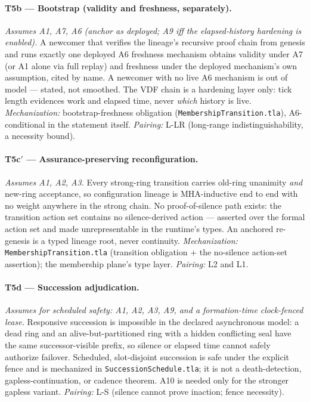 \documentclass[11pt]{article}
\newcommand{\code}[1]{\texttt{#1}}
\begin{document}
\paragraph{T5b --- Bootstrap (validity and freshness, separately).}
\textit{Assumes A1, A7, A6 (anchor as deployed; A9 iff the elapsed-history
hardening is enabled).} A newcomer that verifies the lineage's recursive
proof chain from genesis and runs exactly one deployed A6 freshness
mechanism obtains validity under A7 (or A1 alone via full replay) and
freshness under the deployed mechanism's own assumption, cited by name. A
newcomer with no live A6 mechanism is out of model --- stated, not
smoothed. The VDF chain is a hardening layer only: tick length evidences
work and elapsed time, never \emph{which} history is live.
\textit{Mechanization:} bootstrap-freshness obligation
(\code{MembershipTransition.tla}), A6-conditional in the statement
itself. \textit{Pairing:} L-LR (long-range indistinguishability, a
necessity bound).

\paragraph{T5c\('\) --- Assurance-preserving reconfiguration.}
\textit{Assumes A1, A2, A3.} Every strong-ring transition carries old-ring
unanimity \emph{and} new-ring acceptance, so configuration lineage is
MHA-inductive end to end with no weight anywhere in the strong chain. No
proof-of-silence path exists: the transition action set contains no
silence-derived action --- asserted over the formal action set and made
unrepresentable in the runtime's types. An anchored re-genesis is a typed
lineage root, never continuity.
\textit{Mechanization:} \code{MembershipTransition.tla} (transition
obligation + the no-silence action-set assertion); the membership plane's
type layer. \textit{Pairing:} L2 and L1.

\paragraph{T5d --- Succession adjudication.}
\textit{Assumes for scheduled safety: A1, A2, A3, A9, and a
formation-time clock-fenced lease.} Responsive succession is impossible in
the declared asynchronous model: a dead ring and an alive-but-partitioned ring
with a hidden conflicting seal have the same successor-visible prefix, so
silence or elapsed time cannot safely authorize failover. Scheduled,
slot-disjoint succession is safe under the explicit fence and is mechanized in
\code{SuccessionSchedule.tla}; it is not a death-detection, gapless-continuation,
or cadence theorem. A10 is needed only for the stronger gapless variant.
\textit{Pairing:} L-S (silence cannot prove inaction; fence necessity).
\end{document}
